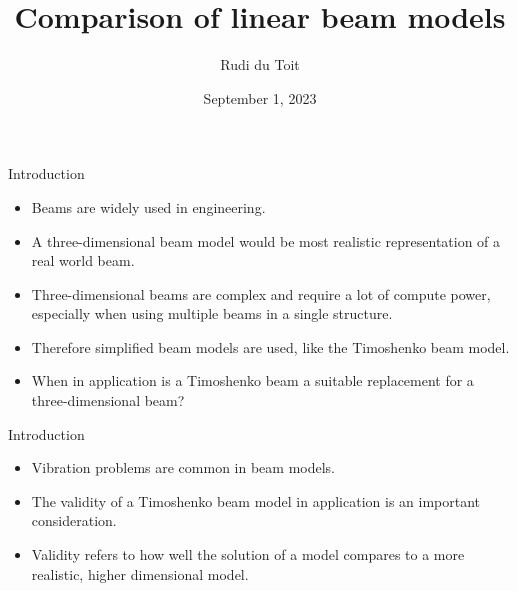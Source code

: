 \documentclass{beamer}
\title{Comparison of linear beam models}
\author{Rudi du Toit}
\date{September 1, 2023}
\institute{University of Pretoria}
\begin{document}

\begin{frame}[plain]
\titlepage
\end{frame}

\begin{frame}{Introduction}
    \begin{itemize}
        \item Beams are widely used in engineering.
        \item A three-dimensional beam model would be most realistic representation of a real world beam.
        \item Three-dimensional beams are complex and require a lot of compute power, especially when using multiple beams in a single structure.
        \item Therefore simplified beam models are used, like the Timoshenko beam model.
        \item When in application is a Timoshenko beam a suitable replacement for a three-dimensional beam?
    \end{itemize}
\end{frame}

\begin{frame}{Introduction}
    \begin{itemize}
        \item Vibration problems are common in beam models.
        \item The validity of a Timoshenko beam model in application is an important consideration.
        \item Validity refers to how well the solution of a model compares to a more realistic, higher dimensional model.
    \end{itemize}
\end{frame}
\end{document}
